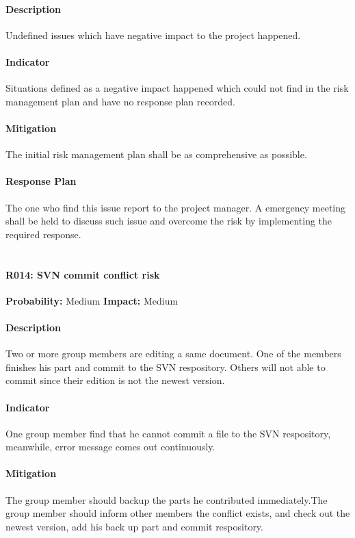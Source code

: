 \documentclass[11pt, a4paper]{report}
\begin{document}
	\paragraph{Description}Undefined issues which have negative impact to the project happened.
	\paragraph{Indicator}Situations defined as a negative impact happened which could not find in the risk management plan and have no response plan recorded.
	\paragraph{Mitigation}The initial risk management plan shall be as comprehensive as possible.
	\paragraph{Response Plan}The one who find this issue report to the project manager. A emergency meeting shall be held to discuss such issue and overcome the risk by implementing the required response.  \\\\

	\paragraph{R014: SVN commit conflict risk} \hspace{1cm} \textbf{Probability: }Medium\hspace{1cm}   \textbf{Impact: }Medium
	\paragraph{Description}Two or more group members are editing a same document. One of the members finishes his part and commit to the SVN respository. Others will not able to commit since their edition is not the newest version.
	\paragraph{Indicator}One group member find that he cannot commit a file to the SVN respository, meanwhile, error message comes out continuously.
	\paragraph{Mitigation}The group member should backup the parts he contributed immediately.The group member should inform other members the conflict exists, and check out the newest version, add his back up part and commit respository.
\end{document}
